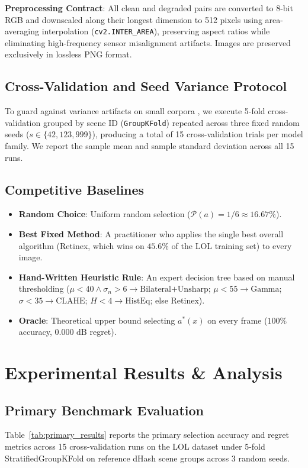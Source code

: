 \documentclass[journal]{IEEEtran}
\begin{document}
\textbf{Preprocessing Contract}: All clean and degraded pairs are converted to 8-bit RGB and downscaled along their longest dimension to 512 pixels using area-averaging interpolation (\texttt{cv2.INTER\_AREA}), preserving aspect ratios while eliminating high-frequency sensor misalignment artifacts. Images are preserved exclusively in lossless PNG format.

\subsection{Cross-Validation and Seed Variance Protocol}
To guard against variance artifacts on small corpora \cite{bouthillier2021accounting}, we execute 5-fold cross-validation grouped by scene ID (\texttt{GroupKFold}) repeated across three fixed random seeds ($s \in \{42, 123, 999\}$), producing a total of 15 cross-validation trials per model family. We report the sample mean and sample standard deviation across all 15 runs.

\subsection{Competitive Baselines}
\begin{itemize}
    \item \textbf{Random Choice}: Uniform random selection ($\mathcal{P}(a) = 1/6 \approx 16.67\%$).
    \item \textbf{Best Fixed Method}: A practitioner who applies the single best overall algorithm (Retinex, which wins on $45.6\%$ of the LOL training set) to every image.
    \item \textbf{Hand-Written Heuristic Rule}: An expert decision tree based on manual thresholding ($\mu < 40 \land \sigma_n > 6 \to \text{Bilateral+Unsharp}$; $\mu < 55 \to \text{Gamma}$; $\sigma < 35 \to \text{CLAHE}$; $H < 4 \to \text{HistEq}$; else Retinex).
    \item \textbf{Oracle}: Theoretical upper bound selecting $a^*(x)$ on every frame ($100\%$ accuracy, $0.000\text{ dB}$ regret).
\end{itemize}

\section{Experimental Results \& Analysis}

\subsection{Primary Benchmark Evaluation}
Table~\ref{tab:primary_results} reports the primary selection accuracy and regret metrics across 15 cross-validation runs on the LOL dataset under 5-fold StratifiedGroupKFold on reference dHash scene groups across 3 random seeds.
\end{document}
